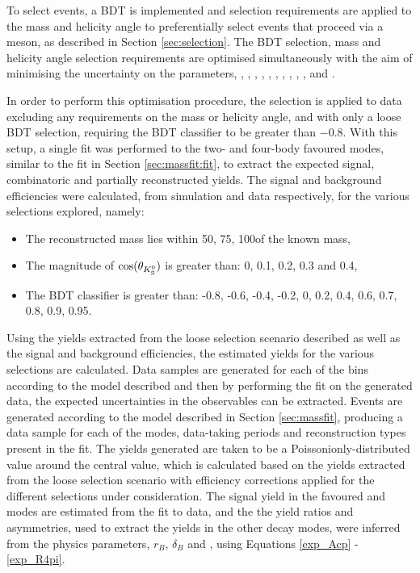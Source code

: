 To select \btodkst events, a BDT is implemented and selection requirements are applied to the \Kstar mass and \KS helicity angle to preferentially select events that proceed via a \Kstar meson, as described in Section \ref{sec:selection}. The BDT selection, \Kstar mass and \KS helicity angle selection requirements are optimised simultaneously with the aim of minimising the uncertainty on the \CP parameters, \Akpi, \Akk, \Apipi, \Rkk, \Rpipi, \Rptwo, \Rmtwo, \Akpipipi, \Apipipipi, \Rpipipipi, \Rpfour and \Rmfour. 

In order to perform this optimisation procedure, the selection is applied to data excluding any requirements on the \Kstarm mass or \KS helicity angle, and with only a loose BDT selection, requiring the BDT classifier to be greater than $-0.8$. With this setup, a single fit was performed to the two- and four-body favoured modes, similar to the fit in Section \ref{sec:massfit:fit}, to extract the expected signal, combinatoric and partially reconstructed yields. The signal and background efficiencies were calculated, from simulation and data respectively, for the various selections explored, namely:

\begin{itemize}
\item{The reconstructed \Kstarm mass lies within 50\mevcc, 75\mevcc, 100\mevcc of the known \Kstarm mass,}
\item{The magnitude of $\cos(\theta_{{{K}^0_{\mathrm{ \scriptscriptstyle S}}}})$ is greater than: 0, 0.1, 0.2, 0.3 and 0.4,}
\item{The BDT classifier is greater than: -0.8, -0.6, -0.4, -0.2, 0, 0.2, 0.4, 0.6, 0.7, 0.8, 0.9, 0.95.}
\end{itemize}

Using the yields extracted from the loose selection scenario described as well as the signal and background efficiencies, the estimated yields for the various selections are calculated. Data samples are generated for each of the bins according to the model described and then by performing the \CP fit on the generated data, the expected uncertainties in the \CP observables can be extracted. Events are generated according to the model described in Section \ref{sec:massfit}, producing a data sample for each of the \Dz modes, data-taking periods and \KS reconstruction types present in the \CP fit. The yields generated are taken to be a Poissonionly-distributed value around the central value, which is calculated based on the yields extracted from the loose selection scenario with efficiency corrections applied for the different selections under consideration. The signal yield in the favoured \kpi and \kpipipi modes are estimated from the fit to data, and the the yield ratios and asymmetries, used to extract the yields in the other \Dz decay modes, were inferred from the physics parameters, $r_B$, $\delta_B$ and \Pgamma, using Equations \ref{exp_Acp} - \ref{exp_R4pi}. 

